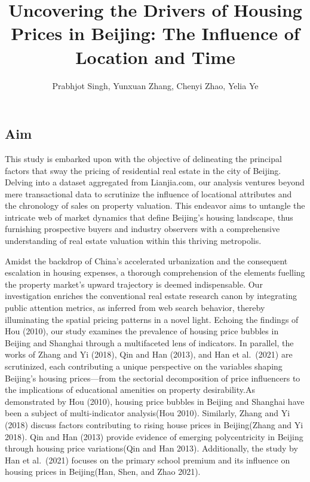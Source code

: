 \documentclass[
  letterpaper,
  DIV=11,
  numbers=noendperiod]{scrartcl}
\title{Uncovering the Drivers of Housing Prices in Beijing: The
Influence of Location and Time}
\author{Prabhjot Singh, Yunxuan Zhang, Chenyi Zhao, Yelia Ye}
\date{}
\renewcommand*\contentsname{Table of contents}
\newcommand\contentsname{Table of contents}
\begin{document}
\maketitle

\renewcommand*\contentsname{Table of contents}
{
\hypersetup{linkcolor=}
\setcounter{tocdepth}{2}
\tableofcontents
}
\subsection{Aim}\label{aim}

This study is embarked upon with the objective of delineating the
principal factors that sway the pricing of residential real estate in
the city of Beijing. Delving into a dataset aggregated from Lianjia.com,
our analysis ventures beyond mere transactional data to scrutinize the
influence of locational attributes and the chronology of sales on
property valuation. This endeavor aims to untangle the intricate web of
market dynamics that define Beijing's housing landscape, thus furnishing
prospective buyers and industry observers with a comprehensive
understanding of real estate valuation within this thriving metropolis.

Amidst the backdrop of China's accelerated urbanization and the
consequent escalation in housing expenses, a thorough comprehension of
the elements fuelling the property market's upward trajectory is deemed
indispensable. Our investigation enriches the conventional real estate
research canon by integrating public attention metrics, as inferred from
web search behavior, thereby illuminating the spatial pricing patterns
in a novel light. Echoing the findings of Hou (2010), our study examines
the prevalence of housing price bubbles in Beijing and Shanghai through
a multifaceted lens of indicators. In parallel, the works of Zhang and
Yi (2018), Qin and Han (2013), and Han et al.~(2021) are scrutinized,
each contributing a unique perspective on the variables shaping
Beijing's housing prices---from the sectorial decomposition of price
influencers to the implications of educational amenities on property
desirability.As demonstrated by Hou (2010), housing price bubbles in
Beijing and Shanghai have been a subject of multi-indicator analysis(Hou
2010). Similarly, Zhang and Yi (2018) discuss factors contributing to
rising house prices in Beijing(Zhang and Yi 2018). Qin and Han (2013)
provide evidence of emerging polycentricity in Beijing through housing
price variations(Qin and Han 2013). Additionally, the study by Han et
al.~(2021) focuses on the primary school premium and its influence on
housing prices in Beijing(Han, Shen, and Zhao 2021).
\end{document}
